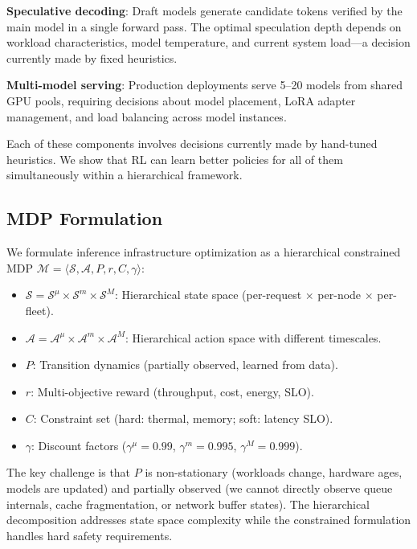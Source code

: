 \documentclass[conference,10pt]{IEEEtran}
\begin{document}
\textbf{Speculative decoding}: Draft models generate candidate tokens verified by the main model in a single forward pass. The optimal speculation depth depends on workload characteristics, model temperature, and current system load---a decision currently made by fixed heuristics.

\textbf{Multi-model serving}: Production deployments serve 5--20 models from shared GPU pools, requiring decisions about model placement, LoRA adapter management, and load balancing across model instances.

Each of these components involves decisions currently made by hand-tuned heuristics. We show that RL can learn better policies for all of them simultaneously within a hierarchical framework.

\subsection{MDP Formulation}

We formulate inference infrastructure optimization as a hierarchical constrained MDP $\mathcal{M} = \langle \mathcal{S}, \mathcal{A}, P, r, C, \gamma \rangle$:

\begin{itemize}
\item $\mathcal{S} = \mathcal{S}^{\mu} \times \mathcal{S}^{m} \times \mathcal{S}^{M}$: Hierarchical state space (per-request $\times$ per-node $\times$ per-fleet).
\item $\mathcal{A} = \mathcal{A}^{\mu} \times \mathcal{A}^{m} \times \mathcal{A}^{M}$: Hierarchical action space with different timescales.
\item $P$: Transition dynamics (partially observed, learned from data).
\item $r$: Multi-objective reward (throughput, cost, energy, SLO).
\item $C$: Constraint set (hard: thermal, memory; soft: latency SLO).
\item $\gamma$: Discount factors ($\gamma^{\mu}=0.99$, $\gamma^{m}=0.995$, $\gamma^{M}=0.999$).
\end{itemize}

The key challenge is that $P$ is non-stationary (workloads change, hardware ages, models are updated) and partially observed (we cannot directly observe queue internals, cache fragmentation, or network buffer states). The hierarchical decomposition addresses state space complexity while the constrained formulation handles hard safety requirements.
\end{document}
